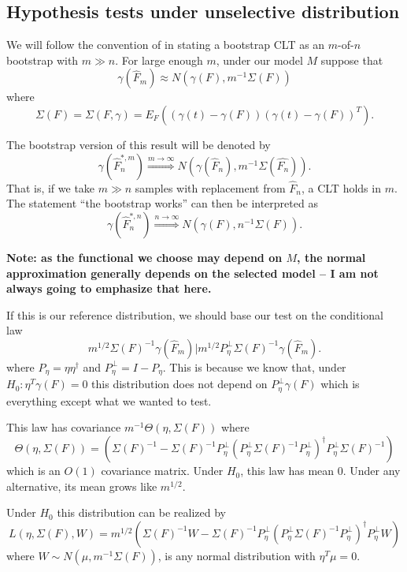 \documentclass{article}
\begin{document}
\subsection{Hypothesis tests under unselective distribution}


We will follow the convention of \cite{penn_pairs} in stating
a bootstrap CLT as an $m$-of-$n$ bootstrap with $m \gg n$.
For large enough $m$, under our model $M$ suppose that
$$
\gamma(\hat{F}_m) \approx N(\gamma(F), m^{-1} \Sigma(F))
$$
where
$$
\Sigma(F) = \Sigma(F,\gamma) = E_{F}\left((\gamma(t) - \gamma(F))(\gamma(t) - \gamma(F))^T \right).
$$

The bootstrap version of this result will be denoted by
$$
\gamma(\hat{F}^{*,m}_n) \overset{m \to \infty}{\Rightarrow} N(\gamma(\hat{F}_n), m^{-1} \Sigma(\hat{F_n})).
$$
That is, if we take $m \gg n$ samples with replacement from $\hat{F}_n$, 
a CLT holds in $m$. The statement ``the bootstrap works'' can then
be interpreted as 
$$
\gamma(\hat{F}^{*,n}_n) \overset{n \to \infty}{\Rightarrow} N(\gamma(F), n^{-1} \Sigma(F)).
$$


{\bf Note: as the functional
we choose may depend on $M$, the normal approximation generally depends 
on the selected model -- I am not always going to emphasize that here.}

If this is our reference distribution, we should base our test on the 
conditional law 
$$m^{1/2}\Sigma(F)^{-1}\gamma(\hat{F}_m) \big \vert m^{1/2} P_{\eta}^{\perp}\Sigma(F)^{-1}\gamma(\hat{F}_m).$$ 
where $P_{\eta}=\eta\eta^{\dagger}$ and $P_{\eta}^{\perp} = I - P_{\eta}$.
This is because
we know that, under $H_0:\eta^T\gamma(F)=0$
this distribution does not depend on $P_{\eta}^{\perp}\gamma(F)$ which
is everything except what we wanted to test. 
 
This 
law has covariance $m^{-1} \Theta(\eta, \Sigma(F))$ where
$$
\Theta(\eta, \Sigma(F)) = \left(\Sigma(F)^{-1} - \Sigma(F)^{-1} P_{\eta}^{\perp} \left(P_{\eta}^{\perp} \Sigma(F)^{-1} P_{\eta}^{\perp} \right)^{\dagger}  P_{\eta}^{\perp} \Sigma(F)^{-1}  \right)
$$
which is an $O(1)$ covariance matrix.
Under $H_0$, this law has mean 0. Under any alternative, its mean grows like $m^{1/2}$.

Under $H_0$
this distribution can be realized by 
$$
L(\eta, \Sigma(F), W) = m^{1/2} \left(\Sigma(F)^{-1} W - \Sigma(F)^{-1} P_{\eta}^{\perp} \left(P_{\eta}^{\perp} 
\Sigma(F)^{-1} P_{\eta}^{\perp} \right)^{\dagger}  P_{\eta}^{\perp} W \right)
$$
where $W \sim N(\mu, m^{-1}\Sigma(F))$, is any normal distribution with
$\eta^T\mu=0$.
\end{document}
